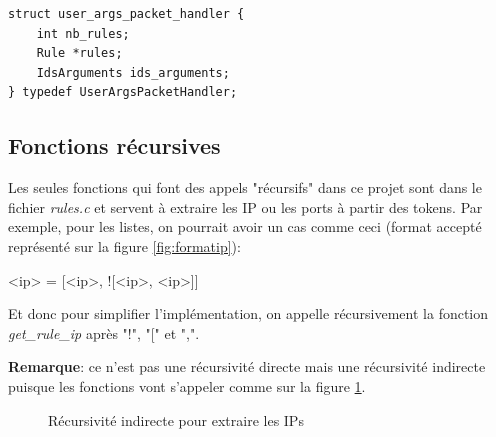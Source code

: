 \documentclass[a4paper]{article}
\begin{document}
\begin{lstlisting}[style=CStyle]
struct user_args_packet_handler {
    int nb_rules;
    Rule *rules;
    IdsArguments ids_arguments;
} typedef UserArgsPacketHandler;
\end{lstlisting}





\subsection{Fonctions récursives}



Les seules fonctions qui font des appels "récursifs" dans ce projet sont dans le fichier \textit{rules.c} et servent à extraire les IP ou les ports à partir des tokens. Par exemple, pour les listes, on pourrait avoir un cas comme ceci (format accepté représenté sur la figure \ref{fig:formatip}):
\begin{center} <ip> = [<ip>, ![<ip>, <ip>]] \end{center}
Et donc pour simplifier l'implémentation, on appelle récursivement la fonction \textit{get\_rule\_ip} après "!", "[" et ",".

\textbf{Remarque}: ce n'est pas une récursivité directe mais une récursivité indirecte puisque les fonctions vont s'appeler comme sur la figure \ref{fig:recursive}.

\begin{figure}[H]
    \centering
    \caption{Récursivité indirecte pour extraire les IPs}
    \label{fig:recursive}
\end{figure}
\end{document}

